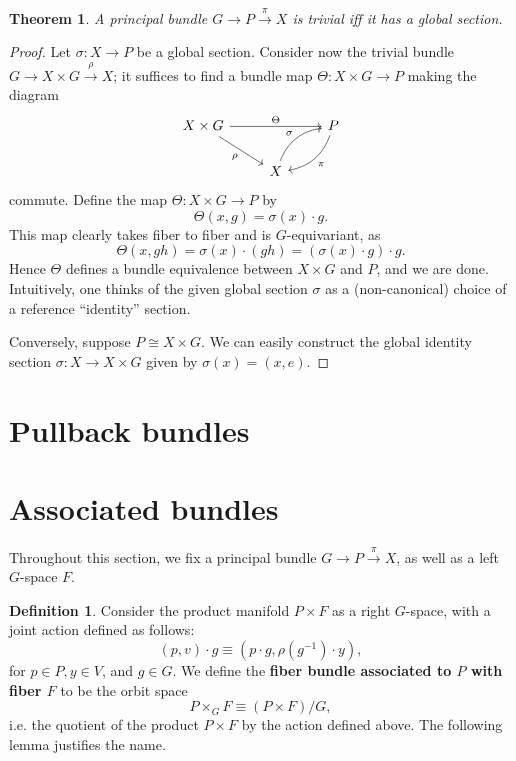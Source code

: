 \documentclass{book}
\theoremstyle{plain}
\newtheorem{thm}{Theorem}
\theoremstyle{definition}
\newtheorem{defn}{Definition}
\theoremstyle{remark}
\begin{document}
\begin{thm}
    A principal bundle $G\to P\overset{\pi}{\to} X$ is trivial iff it has a global section.
\end{thm}
\begin{proof}
    Let $\sigma:X\to P$ be a global section. Consider now the trivial bundle $G\to X\times G\overset{\rho}{\to}X$; it suffices to find a bundle map $\Theta: X\times G\to P$ making the diagram 
    \begin{equation*}
        \begin{tikzcd}
            X\times G\arrow{rr}{\Theta}\arrow[swap]{rd}{\rho}&&P\arrow[bend left]{ld}{\pi}\\
            &X\arrow[bend left]{ru}{\sigma}&
        \end{tikzcd}
    \end{equation*}
    commute. Define the map $\Theta:X\times G\to P$ by
    \[\Theta(x,g)=\sigma(x)\cdot g.\]
    This map clearly takes fiber to fiber and is $G$-equivariant, as
    \[\Theta(x,gh)=\sigma(x)\cdot (gh)=(\sigma(x)\cdot g)\cdot g.\]
    Hence $\Theta$ defines a bundle equivalence between $X\times G$ and $P$, and we are done. Intuitively, one thinks of the given global
    section $\sigma$ as a (non-canonical) choice of a reference ``identity'' section.

    Conversely, suppose $P\cong X\times G$. We can easily construct the global identity section $\sigma: X\to X\times G$ given by $\sigma(x)=(x,e)$.
\end{proof}

\section{Pullback bundles}

\section{Associated bundles}

Throughout this section, we fix a principal bundle $G\to P\xrightarrow{\pi}X$, as well as a 
left $G$-space $F$. 

\begin{defn}
Consider the product manifold $P\times F$ as a right $G$-space, with a joint action defined as follows:
\[(p,v)\cdot g\equiv(p\cdot g, \rho(g^{-1})\cdot y),\]
for $p\in P,y\in V$, and $g\in G$. We define the \textbf{fiber bundle associated to $P$ with fiber $F$} to be the orbit space
\[P\times_G F\equiv (P\times F)/G,\]
i.e. the quotient of the product $P\times F$ by the action defined above. The following lemma
justifies the name.
\end{defn}
\end{document}

